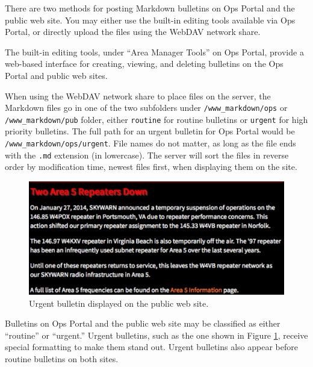\documentclass[pdflatex,letterpaper,twoside,12pt]{book}
\begin{document}
There are two methods for posting Markdown bulletins on Ops Portal and the public web site.  You may either use the built-in editing tools available via Ops Portal, or directly upload the files using the WebDAV network share.

The built-in editing tools, under ``Area Manager Tools'' on Ops Portal, provide a web-based interface for creating, viewing, and deleting bulletins on the Ops Portal and public web sites.


When using the WebDAV network share to place files on the server, the Markdown files go in one of the two subfolders under \texttt{/www\_markdown/ops} or \texttt{/www\_markdown/pub} folder, either \texttt{routine} for routine bulletins or \texttt{urgent} for high priority bulletins.  The full path for an urgent bulletin for Ops Portal would be \texttt{/www\_markdown/ops/urgent}.  File names do not matter, as long as the file ends with the \texttt{.md} extension (in lowercase).  The server will sort the files in reverse order by modification time, newest files first, when displaying them on the site.

\begin{figure}[t]
  \centering
  \includegraphics[width=\textwidth,keepaspectratio=true]{img/urgent-bulletin}
  \caption{Urgent bulletin displayed on the public web site.\label{fig:urgent-bulletin}}
\end{figure}

Bulletins on Ops Portal and the public web site may be classified as either ``routine'' or ``urgent.''  Urgent bulletins, such as the one shown in Figure \ref{fig:urgent-bulletin}, receive special formatting to make them stand out.  Urgent bulletins also appear before routine bulletins on both sites.
\end{document}
